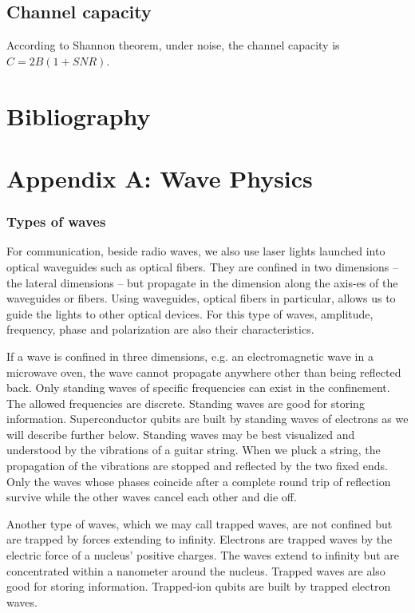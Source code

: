 \documentclass{book}
\begin{document}
\section{Channel capacity}
According to Shannon theorem, under noise, the channel capacity is $C = 2B (1+SNR)$.


\chapter{Bibliography}

   

\chapter{Appendix A: Wave Physics}

\subsection{Types of waves}

For communication, beside radio waves, we also use laser lights launched into optical waveguides such as optical fibers. They are confined in two dimensions -- the lateral dimensions -- but propagate in the dimension along the axis-es of the waveguides or fibers. Using waveguides, optical fibers in particular, allows us to guide the lights to other optical devices. For this type of waves, amplitude, frequency, phase and polarization are also their characteristics.

If a wave is confined in three dimensions, e.g. an electromagnetic wave in a microwave oven, the wave cannot propagate anywhere other than being reflected back. Only standing waves of specific frequencies can exist in the confinement. The allowed frequencies are discrete. Standing waves are good for storing information. Superconductor qubits are built by standing waves of electrons as we will describe further below. Standing waves may be best visualized and understood by the vibrations of a guitar string. When we pluck a string, the propagation of the vibrations are stopped and reflected by the two fixed ends. Only the waves whose phases coincide after a complete round trip of reflection survive while the other waves cancel each other and die off.

Another type of waves, which we may call trapped waves, are not confined but are trapped by forces extending to infinity. Electrons are trapped waves by the electric force of a nucleus' positive charges. The waves extend to infinity but are concentrated within a nanometer around the nucleus. Trapped waves are also good for storing information. Trapped-ion qubits are built by trapped electron waves.
\end{document}
